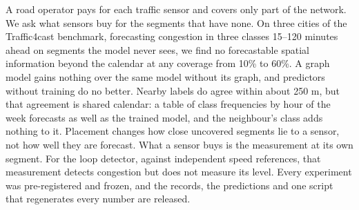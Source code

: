 A road operator pays for each traffic sensor and covers only part of the network. We ask what sensors buy for the segments that have none. On three cities of the Traffic4cast benchmark, forecasting congestion in three classes 15–120 minutes ahead on segments the model never sees, we find no forecastable spatial information beyond the calendar at any coverage from 10\% to 60\%. A graph model gains nothing over the same model without its graph, and predictors without training do no better. Nearby labels do agree within about 250 m, but that agreement is shared calendar: a table of class frequencies by hour of the week forecasts as well as the trained model, and the neighbour's class adds nothing to it. Placement changes how close uncovered segments lie to a sensor, not how well they are forecast. What a sensor buys is the measurement at its own segment. For the loop detector, against independent speed references, that measurement detects congestion but does not measure its level. Every experiment was pre-registered and frozen, and the records, the predictions and one script that regenerates every number are released.
